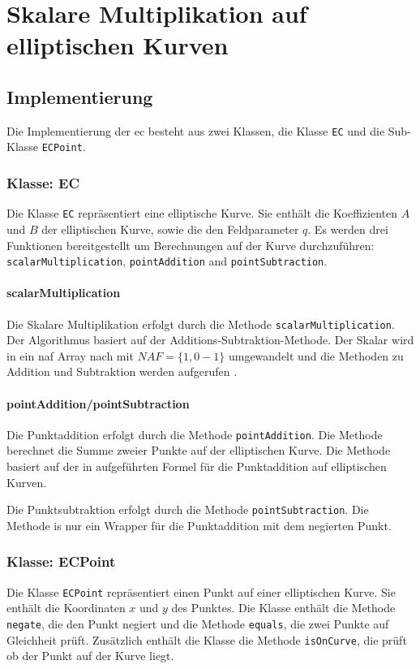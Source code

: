 \chapter{Skalare Multiplikation auf elliptischen Kurven}

\section{Implementierung}
Die Implementierung der \gls{ec} besteht aus zwei Klassen, die Klasse \texttt{EC} und die Sub-Klasse \texttt{ECPoint}.

\subsection{Klasse: EC}
Die Klasse \texttt{EC} repräsentiert eine elliptische Kurve. Sie enthält die Koeffizienten $A$ und $B$ der elliptischen Kurve, sowie die den Feldparameter $q$. Es werden drei Funktionen bereitgestellt um Berechnungen auf der Kurve durchzuführen: \texttt{scalarMultiplication}, \texttt{pointAddition} and \texttt{pointSubtraction}.

\subsubsection{scalarMultiplication}
Die Skalare Multiplikation erfolgt durch die Methode \texttt{scalarMultiplication}. Der Algorithmus basiert auf der Additions-Subtraktion-Methode. Der Skalar wird in ein \gls{naf} Array nach \cite{enwiki:1153415896} mit $NAF = \{1,0-1\}$ umgewandelt und die Methoden zu Addition und Subtraktion werden aufgerufen \cite{891000}.

\subsubsection{pointAddition/pointSubtraction}
Die Punktaddition erfolgt durch die Methode \texttt{pointAddition}. Die Methode berechnet die Summe zweier Punkte auf der elliptischen Kurve. Die Methode basiert auf der in \cite{891000} aufgeführten Formel für die Punktaddition auf elliptischen Kurven.

Die Punktsubtraktion erfolgt durch die Methode \texttt{pointSubtraction}. Die Methode is nur ein Wrapper für die Punktaddition mit dem negierten Punkt.

\subsection{Klasse: ECPoint}
Die Klasse \texttt{ECPoint} repräsentiert einen Punkt auf einer elliptischen Kurve. Sie enthält die Koordinaten $x$ und $y$ des Punktes. Die Klasse enthält die Methode \texttt{negate}, die den Punkt negiert und die Methode \texttt{equals}, die zwei Punkte auf Gleichheit prüft. Zusätzlich enthält die Klasse die Methode \texttt{isOnCurve}, die prüft ob der Punkt auf der Kurve liegt.

